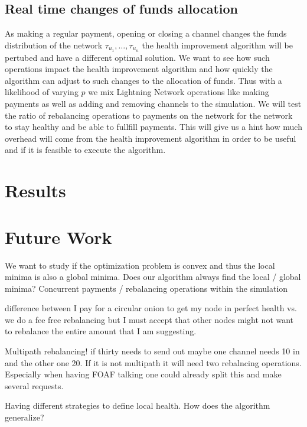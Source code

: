 \documentclass[a4paper]{paper}
\begin{document}
\subsection{Real time changes of funds allocation}
As making a regular payment, opening or closing a channel changes the funds distribution of the network $\tau_{u_1},\dots,\tau_{u_n}$ the health improvement algorithm will be pertubed and have a different optimal solution.
We want to see how such operations impact the health improvement algorithm and how quickly the algorithm can adjust to such changes to the allocation of funds.
Thus with a likelihood of varying $p$ we mix Lightning Network operations like making payments as well as adding and removing channels to the simulation.
We will test the ratio of rebalancing operations to payments on the network for the network to stay healthy and be able to fullfill payments.
This will give us a hint how much overhead will come from the health improvement algorithm in order to be useful and if it is feasible to execute the algorithm.

\section{Results}



\section{Future Work}
We want to study if the optimization problem is convex and thus the local minima is also a global minima.
Does our algorithm always find the local / global minima?
Concurrent payments / rebalancing operations within the simulation

difference between I pay for a circular onion to get my node in perfect health vs. we do a fee free rebalancing but I must accept that other nodes might not want to rebalance the entire amount that I am suggesting.

Multipath rebalancing! if thirty needs to send out maybe one channel needs 10 in and the other one 20. If it is not multipath it will need two rebalncing operations. Especially when having FOAF talking one could already split this and make several requests.

Having different strategies to define local health. How does the algorithm generalize? 
\end{document}
